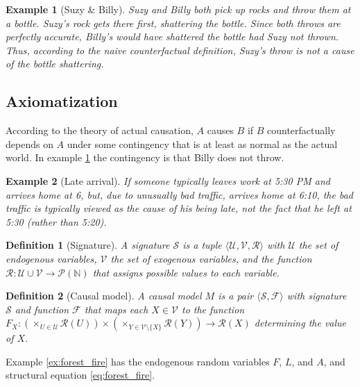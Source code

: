 \documentclass{iosart2c}
\newcommand{\naturalnumbers}[0]{\mathbb{N}}
\newcommand{\pair}[2]{\langle#1,#2\rangle}
\newcommand{\powerset}[1]{\mathcal{P}(#1)}
\newcommand{\set}[1]{\{#1\}}
\newcommand{\triple}[3]{\langle#1,#2,#3\rangle}
\newcommand{\union}[0]{\cup}
\newtheorem{definition}{Definition}
\newtheorem{example}{Example}
\begin{document}
\begin{example}[Suzy \& Billy]
\label{ex:suzy_billy}
Suzy and Billy both pick up rocks and throw them at a bottle.
Suzy's rock gets there first, shattering the bottle.
Since both throws are perfectly accurate, Billy's would have shattered the bottle had Suzy not thrown.
Thus, according to the naive counterfactual definition, Suzy's throw is not a cause of the bottle shattering.
\end{example}

\subsection{Axiomatization}

According to the theory of actual causation, $A$ causes $B$ if $B$ counterfactually depends on $A$ under some contingency that is at least as normal as the actual world.
In example \ref{ex:suzy_billy} the contingency is that Billy does not throw.

\begin{example}[Late arrival]
\label{ex:late_arrival}
If someone typically leaves work at 5:30 PM and arrives home at 6, but, due to unusually bad traffic, arrives home at 6:10, the bad traffic is typically viewed as the cause of his being late, not the fact that he left at 5:30 (rather than 5:20).
\end{example}

\begin{definition}[Signature]
\label{def:signature}
A signature $\mathcal{S}$ is a tuple $\triple{\mathcal{U}}{\mathcal{V}}{\mathcal{R}}$ with $\mathcal{U}$ the set of endogenous variables, $\mathcal{V}$ the set of exogenous variables, and the function $\mathcal{R} : \mathcal{U} \union \mathcal{V} \rightarrow \powerset{\naturalnumbers}$ that assigns possible values to each variable.
\end{definition}

\begin{definition}[Causal model]
\label{def:causal_model}
A causal model $M$ is a pair $\pair{\mathcal{S}}{\mathcal{F}}$ with signature $\mathcal{S}$ and function $\mathcal{F}$ that maps each $X \in \mathcal{V}$ to the function $F_X : (\times_{U \in \mathcal{U}} \mathcal{R}(U)) \times (\times_{Y \in \mathcal{V} \setminus \set{X}} \mathcal{R}(Y)) \rightarrow \mathcal{R}(X)$ determining the value of $X$.
\end{definition}

Example \ref{ex:forest_fire} has the endogenous random variables $F$, $L$, and $A$, and structural equation \ref{eq:forest_fire}.
\end{document}
